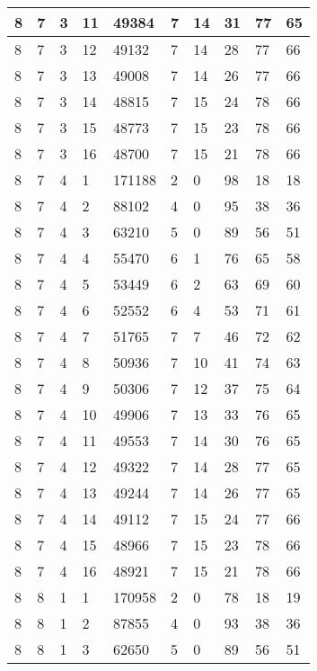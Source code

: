 \begin{table}[!ht]
\begin{tabular}{|l|l|l|l|l|l|l|l|l|l|}
        8 & 7 & 3 & 11 & 49384 & 7 & 14 & 31 & 77 & 65 \\ \hline
        8 & 7 & 3 & 12 & 49132 & 7 & 14 & 28 & 77 & 66 \\ \hline
        8 & 7 & 3 & 13 & 49008 & 7 & 14 & 26 & 77 & 66 \\ \hline
        8 & 7 & 3 & 14 & 48815 & 7 & 15 & 24 & 78 & 66 \\ \hline
        8 & 7 & 3 & 15 & 48773 & 7 & 15 & 23 & 78 & 66 \\ \hline
        8 & 7 & 3 & 16 & 48700 & 7 & 15 & 21 & 78 & 66 \\ \hline
        8 & 7 & 4 & 1 & 171188 & 2 & 0 & 98 & 18 & 18 \\ \hline
        8 & 7 & 4 & 2 & 88102 & 4 & 0 & 95 & 38 & 36 \\ \hline
        8 & 7 & 4 & 3 & 63210 & 5 & 0 & 89 & 56 & 51 \\ \hline
        8 & 7 & 4 & 4 & 55470 & 6 & 1 & 76 & 65 & 58 \\ \hline
        8 & 7 & 4 & 5 & 53449 & 6 & 2 & 63 & 69 & 60 \\ \hline
        8 & 7 & 4 & 6 & 52552 & 6 & 4 & 53 & 71 & 61 \\ \hline
        8 & 7 & 4 & 7 & 51765 & 7 & 7 & 46 & 72 & 62 \\ \hline
        8 & 7 & 4 & 8 & 50936 & 7 & 10 & 41 & 74 & 63 \\ \hline
        8 & 7 & 4 & 9 & 50306 & 7 & 12 & 37 & 75 & 64 \\ \hline
        8 & 7 & 4 & 10 & 49906 & 7 & 13 & 33 & 76 & 65 \\ \hline
        8 & 7 & 4 & 11 & 49553 & 7 & 14 & 30 & 76 & 65 \\ \hline
        8 & 7 & 4 & 12 & 49322 & 7 & 14 & 28 & 77 & 65 \\ \hline
        8 & 7 & 4 & 13 & 49244 & 7 & 14 & 26 & 77 & 65 \\ \hline
        8 & 7 & 4 & 14 & 49112 & 7 & 15 & 24 & 77 & 66 \\ \hline
        8 & 7 & 4 & 15 & 48966 & 7 & 15 & 23 & 78 & 66 \\ \hline
        8 & 7 & 4 & 16 & 48921 & 7 & 15 & 21 & 78 & 66 \\ \hline
        8 & 8 & 1 & 1 & 170958 & 2 & 0 & 78 & 18 & 19 \\ \hline
        8 & 8 & 1 & 2 & 87855 & 4 & 0 & 93 & 38 & 36 \\ \hline
        8 & 8 & 1 & 3 & 62650 & 5 & 0 & 89 & 56 & 51 \\ \hline

\end{tabular}
\end{table}
